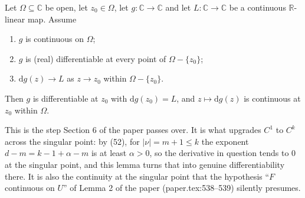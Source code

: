 \begin{lemma}
Let $\Omega\subseteq\mathbb{C}$ be open, let $z_0\in\Omega$, let
$g\colon\mathbb{C}\to\mathbb{C}$ and let $L\colon\mathbb{C}\to\mathbb{C}$ be a
continuous $\mathbb{R}$-linear map.  Assume
\begin{enumerate}
\item[(H1)] $g$ is continuous on $\Omega$;
\item[(H2)] $g$ is (real) differentiable at every point of $\Omega-\{z_0\}$;
\item[(H3)] $\mathrm{d}g(z)\to L$ as $z\to z_0$ within $\Omega-\{z_0\}$.
\end{enumerate}
Then $g$ is differentiable at $z_0$ with $\mathrm{d}g(z_0)=L$, and
$z\mapsto\mathrm{d}g(z)$ is continuous at $z_0$ within $\Omega$.

This is the step Section 6 of the paper passes over.  It is what upgrades $C^1$
to $C^k$ across the singular point: by (52), for $|\nu|=m+1\le k$ the exponent
$d-m=k-1+\alpha-m$ is at least $\alpha>0$, so the derivative in question tends
to $0$ at the singular point, and this lemma turns that into genuine
differentiability there.  It is also the continuity at the singular point that
the hypothesis ``$F$ continuous on $U$'' of Lemma 2 of the paper
(paper.tex:538--539) silently presumes.
\end{lemma}
